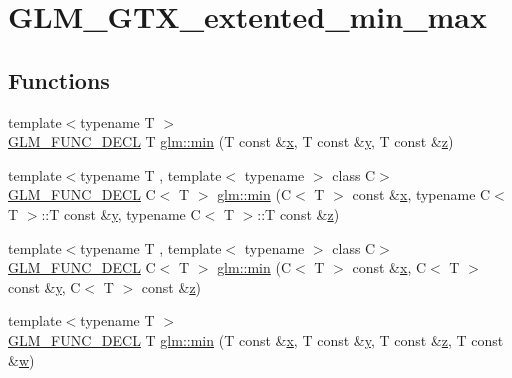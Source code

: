 \hypertarget{group__gtx__extended__min__max}{}\section{G\+L\+M\+\_\+\+G\+T\+X\+\_\+extented\+\_\+min\+\_\+max}
\label{group__gtx__extended__min__max}
\subsection*{Functions}
\begin{DoxyCompactItemize}
\item 
{\footnotesize template$<$typename T $>$ }\\\hyperlink{setup_8hpp_ab2d052de21a70539923e9bcbf6e83a51}{G\+L\+M\+\_\+\+F\+U\+N\+C\+\_\+\+D\+E\+CL} T \hyperlink{group__gtx__extended__min__max_ga713d3f9b3e76312c0d314e0c8611a6a6}{glm\+::min} (T const \&\hyperlink{_s_d_l__opengl_8h_ad0e63d0edcdbd3d79554076bf309fd47}{x}, T const \&\hyperlink{_s_d_l__opengl_8h_a1675d9d7bb68e1657ff028643b4037e3}{y}, T const \&\hyperlink{_s_d_l__opengl__glext_8h_a5e74030ebb3297ce1b37ff716fedd68f}{z})
\item 
{\footnotesize template$<$typename T , template$<$ typename $>$ class C$>$ }\\\hyperlink{setup_8hpp_ab2d052de21a70539923e9bcbf6e83a51}{G\+L\+M\+\_\+\+F\+U\+N\+C\+\_\+\+D\+E\+CL} C$<$ T $>$ \hyperlink{group__gtx__extended__min__max_ga74d1a96e7cdbac40f6d35142d3bcbbd4}{glm\+::min} (C$<$ T $>$ const \&\hyperlink{_s_d_l__opengl_8h_ad0e63d0edcdbd3d79554076bf309fd47}{x}, typename C$<$ T $>$\+::T const \&\hyperlink{_s_d_l__opengl_8h_a1675d9d7bb68e1657ff028643b4037e3}{y}, typename C$<$ T $>$\+::T const \&\hyperlink{_s_d_l__opengl__glext_8h_a5e74030ebb3297ce1b37ff716fedd68f}{z})
\item 
{\footnotesize template$<$typename T , template$<$ typename $>$ class C$>$ }\\\hyperlink{setup_8hpp_ab2d052de21a70539923e9bcbf6e83a51}{G\+L\+M\+\_\+\+F\+U\+N\+C\+\_\+\+D\+E\+CL} C$<$ T $>$ \hyperlink{group__gtx__extended__min__max_ga42b5c3fc027fd3d9a50d2ccc9126d9f0}{glm\+::min} (C$<$ T $>$ const \&\hyperlink{_s_d_l__opengl_8h_ad0e63d0edcdbd3d79554076bf309fd47}{x}, C$<$ T $>$ const \&\hyperlink{_s_d_l__opengl_8h_a1675d9d7bb68e1657ff028643b4037e3}{y}, C$<$ T $>$ const \&\hyperlink{_s_d_l__opengl__glext_8h_a5e74030ebb3297ce1b37ff716fedd68f}{z})
\item 
{\footnotesize template$<$typename T $>$ }\\\hyperlink{setup_8hpp_ab2d052de21a70539923e9bcbf6e83a51}{G\+L\+M\+\_\+\+F\+U\+N\+C\+\_\+\+D\+E\+CL} T \hyperlink{group__gtx__extended__min__max_ga95466987024d03039607f09e69813d69}{glm\+::min} (T const \&\hyperlink{_s_d_l__opengl_8h_ad0e63d0edcdbd3d79554076bf309fd47}{x}, T const \&\hyperlink{_s_d_l__opengl_8h_a1675d9d7bb68e1657ff028643b4037e3}{y}, T const \&\hyperlink{_s_d_l__opengl__glext_8h_a5e74030ebb3297ce1b37ff716fedd68f}{z}, T const \&\hyperlink{_s_d_l__opengl__glext_8h_a6ee8f168a7ab6785a9bb57c6715dad99}{w})

\end{DoxyCompactItemize}
